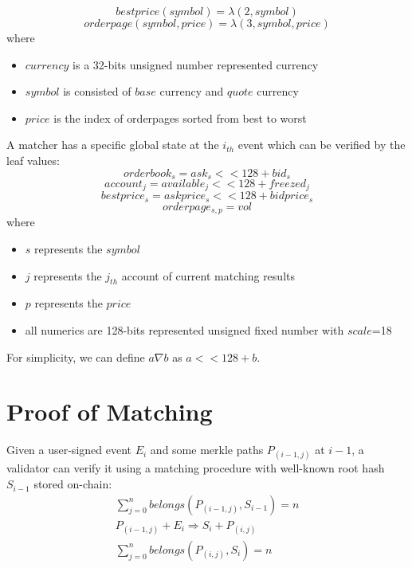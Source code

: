 \documentclass[a4paper,12pt]{article}
\begin{document}
\begin{equation*}
    bestprice(symbol) = \lambda(2, symbol)
\end{equation*}
\begin{equation*}
    orderpage(symbol, price) = \lambda(3, symbol, price)
\end{equation*}
where\\
\begin{itemize}
    \item $currency$ is a 32-bits unsigned number represented currency
    \item $symbol$ is consisted of $base$ currency and $quote$ currency
    \item $price$ is the index of orderpages sorted from best to worst
\end{itemize}

A matcher has a specific global state at the \(i_{th}\) event which can be verified by the leaf values:\\
\begin{equation*}
    orderbook_{s} = ask_{s} << 128 + bid_{s}
\end{equation*}
\begin{equation*}
    account_{j} = available_{j} << 128 + freezed_{j}
\end{equation*}
\begin{equation*}
    bestprice_{s} = askprice_{s} << 128 + bidprice_{s}
\end{equation*}
\begin{equation*}
    orderpage_{s, p} = vol
\end{equation*}
where\\
\begin{itemize}
  \item $s$ represents the $symbol$
  \item $j$ represents the $j_{th}$ account of current matching results
  \item $p$ represents the $price$
  \item all numerics are 128-bits represented unsigned fixed number with $scale$=18
\end{itemize}

For simplicity, we can define \(a \nabla b\) as \(a << 128 + b\).

\section{Proof of Matching}
\label{sec:org48d64ef}
Given a user-signed event \(E_{i}\) and some merkle paths \(P_{(i-1, j)}\) at \(i-1\), a validator can verify it using a matching procedure with well-known root hash \(S_{i-1}\) stored on-chain:\\
\begin{eqnarray*}
\sum\limits_{j=0}^{n} belongs(P_{(i-1, j)}, S_{i-1}) = n\\
P_{(i-1, j)} + E_{i} \Rightarrow S_{i} + P_{(i, j)} \\
\sum\limits_{j=0}^{n} belongs(P_{(i, j)}, S_{i}) = n
\end{eqnarray*}
\end{document}

